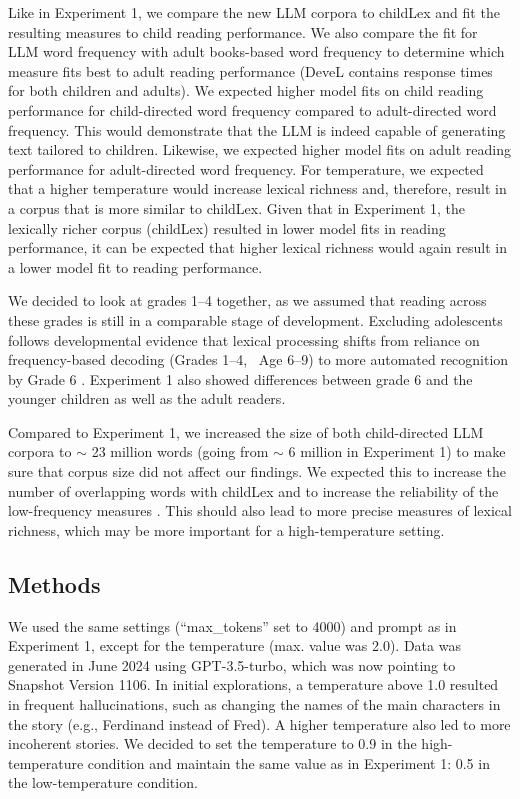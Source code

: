 \documentclass[doc, a4paper, anonymous]{apa7}
\begin{document}
Like in Experiment 1, we compare the new LLM corpora to childLex \citep{schroeder_childlex_2015} and fit the resulting measures to child reading performance. We also compare the fit for LLM word frequency with adult books-based word frequency \citep[DWDS][]{heister_dlexdb_2011} to determine which measure fits best to adult reading performance (DeveL contains response times for both children and adults). We expected higher model fits on child reading performance for child-directed word frequency compared to adult-directed word frequency. This would demonstrate that the LLM is indeed capable of generating text tailored to children. Likewise, we expected higher model fits on adult reading performance for adult-directed word frequency. For temperature, we expected that a higher temperature would increase lexical richness and, therefore, result in a corpus that is more similar to childLex. Given that in Experiment 1, the lexically richer corpus (childLex) resulted in lower model fits in reading performance, it can be expected that higher lexical richness would again result in a lower model fit to reading performance.   

We decided to look at grades 1--4 together, as we assumed that reading across these grades is still in a comparable stage of development. Excluding adolescents follows developmental evidence that lexical processing shifts from reliance on frequency-based decoding (Grades 1--4, ~Age 6--9) to more automated recognition by Grade 6 \citep{meixner2022perceptual}. Experiment 1 also showed differences between grade 6 and the younger children as well as the adult readers. 

Compared to Experiment 1, we increased the size of both child-directed LLM corpora to $\sim$ 23 million words (going from $\sim$ 6 million in Experiment 1) to make sure that corpus size did not affect our findings. We expected this to increase the number of overlapping words with childLex and to increase the reliability of the low-frequency measures \citep{gernsbacher_resolving_1984}. This should also lead to more precise measures of lexical richness, which may be more important for a high-temperature setting. 


\subsection{Methods}

We used the same settings (“max\_tokens” set to 4000) and prompt as in Experiment 1, except for the temperature (max. value was 2.0). Data was generated in June 2024 using GPT-3.5-turbo, which was now pointing to Snapshot Version 1106. In initial explorations, a temperature above 1.0 resulted in frequent hallucinations, such as changing the names of the main characters in the story (e.g., Ferdinand instead of Fred). A higher temperature also led to more incoherent stories. We decided to set the temperature to 0.9 in the high-temperature condition and maintain the same value as in Experiment 1: 0.5 in the low-temperature condition. 
\end{document}
